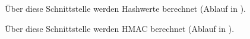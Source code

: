 Über diese Schnittstelle werden Hashwerte berechnet (Ablauf in ).


Über diese Schnittstelle werden HMAC berechnet (Ablauf in ).


